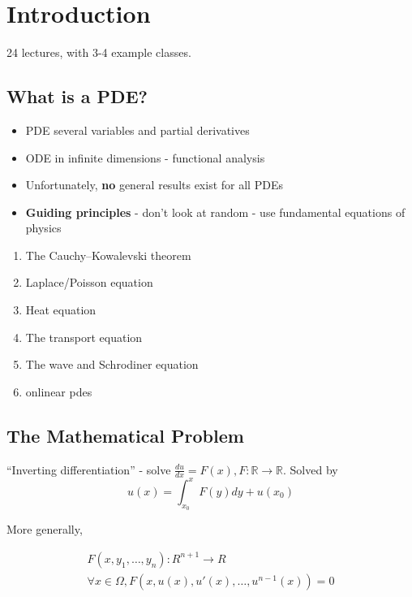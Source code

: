
\chapter{Introduction}
\label{cha:introduction}

24 lectures, with 3-4 example classes.

\section{What is a PDE?}
\label{sec:what-pde}

\begin{itemize}
\item PDE several variables and partial derivatives
\item ODE in infinite dimensions - functional analysis
\item Unfortunately, \textbf{no} general results exist for all PDEs
\item \textbf{Guiding principles} - don't look at random - use
  fundamental equations of physics
\end{itemize}

\begin{enumerate}
\item The Cauchy–Kowalevski theorem
\item Laplace/Poisson equation
\item Heat equation
\item The transport equation
\item The wave and Schrodiner equation
\item onlinear pdes
\end{enumerate}

\section{The Mathematical Problem}
\label{sec:mathematical-problem}

``Inverting differentiation'' - solve $\frac{du}{dx} = F(x),  F:
\mathbb{R} \rightarrow \mathbb{R}$. Solved by
\begin{equation}
  \label{eq:2}
  u(x) = \int_{x_{0}}^{x} F(y)dy + u(x_{0})
\end{equation}

More generally, 

\begin{align}
  \label{eq:3}
  F(x, y_{1}, \dots, y_{n}) : R^{n+1} \rightarrow R \\
  \forall x \in \Omega, F(x, u(x), u'(x), \dots, u^{n-1}(x)) = 0
\end{align}

